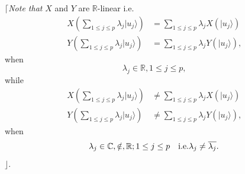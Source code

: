 \documentclass[aps, preprint]{revtex4}
\begin{document}
$\lceil $\emph{Note that} $X$ and $Y$ are $\mathbb{R}$-linear i.e.
\begin{align}X \left (\sum _{1 \leq j \leq p}\lambda _{j}\vert u_{j} \rangle \right ) &  =\sum _{1 \leq j \leq p}\lambda _{j} X \left (\vert u_{j} \rangle \right ) \\
Y \left (\sum _{1 \leq j \leq p}\lambda _{j}\vert u_{j} \rangle \right ) &  =\sum _{1 \leq j \leq p}\lambda _{j} Y \left (\vert u_{j} \rangle \right )\text{,}\end{align}when
\begin{equation}\lambda _{j} \in \mathbb{R} ,1 \leq j \leq p\text{,}
\end{equation}while
\begin{align}X \left (\sum _{1 \leq j \leq p}\lambda _{j}\vert u_{j} \rangle \right ) &  \neq \sum _{1 \leq j \leq p}\lambda _{j} X \left (\vert u_{j} \rangle \right ) \\
Y \left (\sum _{1 \leq j \leq p}\lambda _{j}\vert u_{j} \rangle \right ) &  \neq \sum _{1 \leq j \leq p}\lambda _{j} Y \left (\vert u_{j} \rangle \right )\text{,}\end{align}when
\begin{equation}\lambda _{j} \in \mathbb{C} , \notin  ,\mathbb{R} ;1 \leq j \leq p\text{\quad }\text{i.e} .\lambda _{j} \neq \overline{\lambda _{j}}\text{.}
\end{equation}$\rfloor $. 
\end{document}
